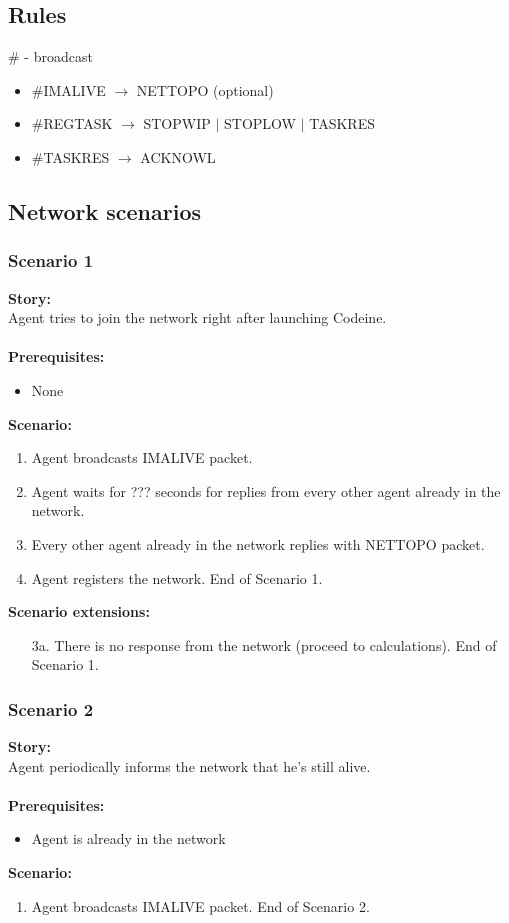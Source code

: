 \documentclass{article}
\begin{document}
\subsection{Rules}
\# - broadcast
\begin{itemize}
    \item \#{}IMALIVE $\rightarrow$ NETTOPO (optional)
    \item \#{}REGTASK $\rightarrow$ STOPWIP $\vert$ STOPLOW $\vert$ TASKRES
    \item \#{}TASKRES $\rightarrow$ ACKNOWL
\end{itemize}

\subsection{Network scenarios}
\subsubsection{Scenario 1}
\noindent\textbf{Story:} \\
Agent tries to join the network right after launching Codeine. \\\\
\textbf{Prerequisites:}
\begin{itemize}
    \item None
\end{itemize}
\textbf{Scenario:}
\begin{enumerate}
    \item Agent broadcasts IMALIVE packet.
    \item Agent waits for ??? seconds for replies from every other agent already in the network.
    \item Every other agent already in the network replies with NETTOPO packet.
    \item Agent registers the network. End of Scenario 1.
\end{enumerate}
\textbf{Scenario extensions:}
\begin{itemize}
    \item[3a.] There is no response from the network (proceed to calculations). End of Scenario 1.
\end{itemize}

\subsubsection{Scenario 2}
\noindent\textbf{Story:} \\
Agent periodically informs the network that he's still alive. \\\\
\textbf{Prerequisites:}
\begin{itemize}
    \item Agent is already in the network
\end{itemize}
\textbf{Scenario:}
\begin{enumerate}
    \item Agent broadcasts IMALIVE packet. End of Scenario 2.
\end{enumerate}
\end{document}

